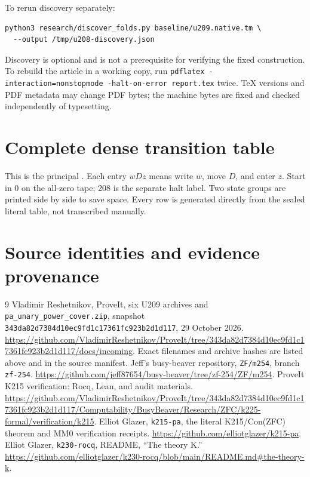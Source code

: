 \documentclass[11pt,letterpaper]{article}
\newcommand{\art}[1]{\path{#1}}
\begin{document}
To rerun discovery separately:
\begin{verbatim}
python3 research/discover_folds.py baseline/u209.native.tm \
  --output /tmp/u208-discovery.json
\end{verbatim}
Discovery is optional and is not a prerequisite for verifying the fixed
construction. To rebuild the article in a working copy, run
\texttt{pdflatex -interaction=nonstopmode -halt-on-error report.tex} twice.
TeX versions and PDF metadata may change PDF bytes; the machine bytes are
fixed and checked independently of typesetting.

\appendix
\clearpage
\section{Complete dense transition table}
\label{app:table}

This is the principal \art{machine/u208.tm}. Each entry \(wDz\) means
write \(w\), move \(D\), and enter \(z\). Start in 0 on the all-zero
tape; 208 is the separate halt label. Two state groups are printed side
by side to save space. Every row is generated directly from the sealed
literal table, not transcribed manually.


\clearpage
\section{Source identities and evidence provenance}
\label{app:provenance}


\begin{thebibliography}{9}
Vladimir Reshetnikov, ProveIt, six U209 archives and
\texttt{pa\_unary\_power\_cover.zip}, snapshot
\texttt{343da82d7384d10ec9fd1c17361fc923b2d1d117}, 29 October 2026.
\url{https://github.com/VladimirReshetnikov/ProveIt/tree/343da82d7384d10ec9fd1c17361fc923b2d1d117/docs/incoming}.
Exact filenames and archive hashes are listed above and in the source manifest.
\bibitem{m254}
Jeff's busy-beaver repository, \texttt{ZF/m254}, branch \texttt{zf-254}.
\url{https://github.com/jeff87654/busy-beaver/tree/zf-254/ZF/m254}.
\bibitem{k215formal}
ProveIt K215 verification: Rocq, Lean, and audit materials.
\url{https://github.com/VladimirReshetnikov/ProveIt/tree/343da82d7384d10ec9fd1c17361fc923b2d1d117/Computability/BusyBeaver/Research/ZFC/k225-formal/verification/k215}.
\bibitem{k215pa}
Elliot Glazer, \texttt{k215-pa}, the literal K215/Con(ZFC) theorem and
MM0 verification receipts.
\url{https://github.com/elliotglazer/k215-pa}.
Elliot Glazer, \texttt{k230-rocq}, README, ``The theory K.''
\url{https://github.com/elliotglazer/k230-rocq/blob/main/README.md#the-theory-k}.
\end{thebibliography}
\end{document}
